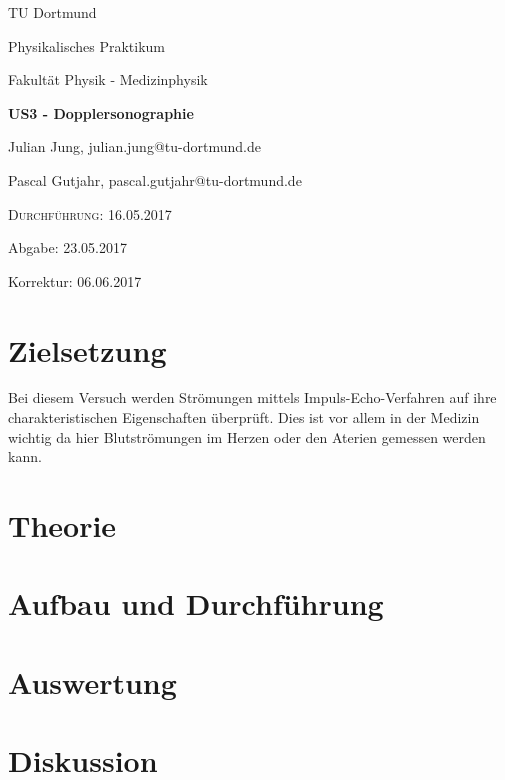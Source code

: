 


\begin{titlepage}
  \centering
  {\LARGE TU Dortmund \par}
  \vspace{0.75cm}
  {\Large Physikalisches Praktikum \par}
  \vspace{0.75cm}
  {\Large Fakultät Physik - Medizinphysik \par}
  \vspace{4cm}
  {\LARGE \bfseries US3 - Dopplersonographie \par}
  \vspace{4cm}
  {\large Julian Jung, julian.jung@tu-dortmund.de \par \vspace{0.25cm}
  Pascal Gutjahr, pascal.gutjahr@tu-dortmund.de \par}
  \vspace{6cm}
  {\scshape Durchführung: 16.05.2017 \par \vspace{0.25cm}
  Abgabe: 23.05.2017 \par \vspace{0.25cm}
  Korrektur: 06.06.2017}
\end{titlepage}
\newpage
\tableofcontents
\newpage
\section{Zielsetzung}
Bei diesem Versuch werden Strömungen mittels Impuls-Echo-Verfahren
auf ihre charakteristischen Eigenschaften
überprüft. Dies ist vor allem in der Medizin wichtig da hier Blutströmungen
im Herzen oder den Aterien gemessen werden kann.
\section{Theorie}
 
\section{Aufbau und Durchführung}
 
\section{Auswertung}
 
\section{Diskussion}
 
\printbibliography

